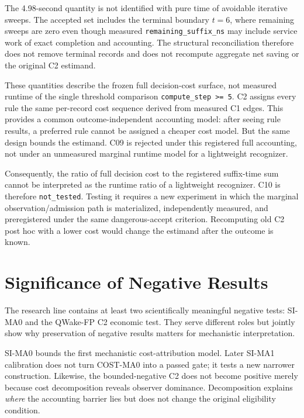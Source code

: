 The 4.98-second quantity is not identified with pure time of avoidable iterative sweeps.
The accepted set includes the terminal boundary \(t=6\), where remaining sweeps are
zero even though measured \texttt{remaining\_suffix\_ns} may include service work of
exact completion and accounting. The structural reconciliation therefore does not
remove terminal records and does not recompute aggregate net saving or the original C2
estimand.

These quantities describe the frozen full decision-cost surface, not measured runtime
of the single threshold comparison \texttt{compute\_step >= 5}. C2 assigns every rule
the same per-record cost sequence derived from measured C1 edges. This provides a
common outcome-independent accounting model: after seeing rule results, a preferred
rule cannot be assigned a cheaper cost model. But the same design bounds the estimand.
C09 is rejected under this registered full accounting, not under an unmeasured marginal
runtime model for a lightweight recognizer.

Consequently, the ratio of full decision cost to the registered suffix-time sum cannot
be interpreted as the runtime ratio of a lightweight recognizer. C10 is therefore
\texttt{not\_tested}. Testing it requires a new experiment in which the marginal
observation/admission path is materialized, independently measured, and preregistered
under the same dangerous-accept criterion. Recomputing old C2 post hoc with a lower cost
would change the estimand after the outcome is known.

\section{Significance of Negative Results}
\label{sec:discussion-negative-results-en}

The research line contains at least two scientifically meaningful negative tests:
SI-MA0 and the QWake-FP C2 economic test. They serve different roles but jointly show
why preservation of negative results matters for mechanistic interpretation.

SI-MA0 bounds the first mechanistic cost-attribution model. Later SI-MA1 calibration
does not turn COST-MA0 into a passed gate; it tests a new narrower construction.
Likewise, the bounded-negative C2 does not become positive merely because cost
decomposition reveals observer dominance. Decomposition explains \emph{where} the
accounting barrier lies but does not change the original eligibility condition.

